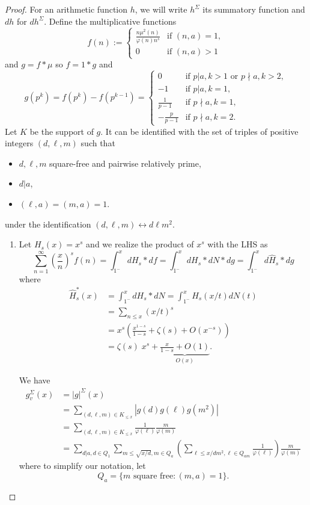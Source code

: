 \documentclass[12pt]{article}
\begin{document}
\begin{proof}
For an arithmetic function $h$, we will write $h^\Sigma$ its summatory function and $dh$ for $dh^\Sigma$.
Define the multiplicative functions
$$f(n) := \begin{cases}
\frac{n \mu^2(n)}{\varphi(n) n^s} &\text{if } (n, a) = 1,\\
0 &\text{if }(n, a) > 1
\end{cases}$$
and $g = f * \mu$ so $f = 1 * g$ and
$$g(p^k) = f(p^k) - f(p^{k-1}) = \begin{cases}
0 &\text{if } p | a, k > 1 \text{ or } p \nmid a, k > 2,\\
-1 &\text{if } p | a, k = 1,\\
\frac{1}{p-1} &\text{if } p \nmid a, k = 1,\\
-\frac{p}{p-1} &\text{if } p \nmid a, k = 2.
\end{cases}$$
Let $K$ be the support of $g$. It can be identified with the set of triples of positive integers $(d, \ell, m)$ such that
\begin{itemize}
\item $d, \ell, m$ square-free and pairwise relatively prime,
\item $d | a$,
\item $(\ell, a) = (m, a) = 1$.
\end{itemize}
under the identification $(d, \ell, m) \leftrightarrow d \ell m^2$.

\begin{enumerate}
\item Let $H_s(x) = x^s$ and we realize the product of $x^s$ with the LHS as
$$\sum_{n = 1}^{\infty} \left(\frac{x}{n}\right)^s f(n) = \int_{1^-}^x dH_s * df = \int_{1^-}^x dH_s * dN * dg = \int_{1^-}^x d \widehat{H}_s * dg$$
where
\begin{align*}
\widehat{H}_s^*(x) &= \int_{1^-}^x dH_s * dN = \int_{1^-}^x H_s(x/t) dN(t)\\
&= \sum_{n \leq x} (x/t)^s\\
&= x^s\left( \frac{x^{1-s}}{1-s} + \zeta(s) + O(x^{-s})\right)\\
&= \zeta(s) \; x^s + \underbrace{\frac{x}{1 - s} + O(1)}_{O(x)}.
\end{align*}

We have
\begin{align*}
g^\Sigma_v(x) &= |g|^\Sigma(x)\\
&= \sum_{(d, \ell, m) \in K_{\leq x}} |g(d) g(\ell) g(m^2)|\\
&= \sum_{(d, \ell, m) \in K_{\leq x}} \frac{1}{\varphi(\ell)} \frac{m}{\varphi(m)}\\
&= \sum_{d | a, d \in Q_1} \sum_{m \leq \sqrt{x/d}, m \in Q_a} \left(\sum_{\ell \leq x/dm^2, \ell \in Q_{am}} \frac{1}{\varphi(\ell)} \right) \frac{m}{\varphi(m)}
\end{align*}
where to simplify our notation, let
$$Q_a = \{m \text{ square free} : (m, a) = 1\}.$$


\end{enumerate}
\end{proof}
\end{document}
